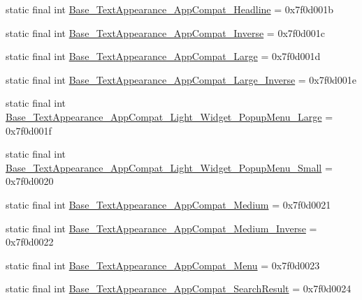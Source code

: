 \begin{DoxyCompactItemize}
\item 
static final int \mbox{\hyperlink{classcom_1_1google_1_1android_1_1gms_1_1R_1_1style_a36754d1d19d09b39f60065f500b5f89e}{Base\+\_\+\+Text\+Appearance\+\_\+\+App\+Compat\+\_\+\+Headline}} = 0x7f0d001b
\item 
static final int \mbox{\hyperlink{classcom_1_1google_1_1android_1_1gms_1_1R_1_1style_ab0fb396710204d40bb229cab77b8211c}{Base\+\_\+\+Text\+Appearance\+\_\+\+App\+Compat\+\_\+\+Inverse}} = 0x7f0d001c
\item 
static final int \mbox{\hyperlink{classcom_1_1google_1_1android_1_1gms_1_1R_1_1style_a6941c83f3d956d91e63c1f87a7c9e48a}{Base\+\_\+\+Text\+Appearance\+\_\+\+App\+Compat\+\_\+\+Large}} = 0x7f0d001d
\item 
static final int \mbox{\hyperlink{classcom_1_1google_1_1android_1_1gms_1_1R_1_1style_a20fa719f89a28f9d9fe107e5ac79b0ca}{Base\+\_\+\+Text\+Appearance\+\_\+\+App\+Compat\+\_\+\+Large\+\_\+\+Inverse}} = 0x7f0d001e
\item 
static final int \mbox{\hyperlink{classcom_1_1google_1_1android_1_1gms_1_1R_1_1style_ac6bddb54745ed50d642f3bd2a5b793bd}{Base\+\_\+\+Text\+Appearance\+\_\+\+App\+Compat\+\_\+\+Light\+\_\+\+Widget\+\_\+\+Popup\+Menu\+\_\+\+Large}} = 0x7f0d001f
\item 
static final int \mbox{\hyperlink{classcom_1_1google_1_1android_1_1gms_1_1R_1_1style_ad3565e7b776ab3a3e8199211100a573c}{Base\+\_\+\+Text\+Appearance\+\_\+\+App\+Compat\+\_\+\+Light\+\_\+\+Widget\+\_\+\+Popup\+Menu\+\_\+\+Small}} = 0x7f0d0020
\item 
static final int \mbox{\hyperlink{classcom_1_1google_1_1android_1_1gms_1_1R_1_1style_ae3614ca0a08c410589f4b9dba8b26224}{Base\+\_\+\+Text\+Appearance\+\_\+\+App\+Compat\+\_\+\+Medium}} = 0x7f0d0021
\item 
static final int \mbox{\hyperlink{classcom_1_1google_1_1android_1_1gms_1_1R_1_1style_ad0374fe4b275da5e000ed1995f115c6c}{Base\+\_\+\+Text\+Appearance\+\_\+\+App\+Compat\+\_\+\+Medium\+\_\+\+Inverse}} = 0x7f0d0022
\item 
static final int \mbox{\hyperlink{classcom_1_1google_1_1android_1_1gms_1_1R_1_1style_ad34110694aa060f7a5d8b7946aca95c6}{Base\+\_\+\+Text\+Appearance\+\_\+\+App\+Compat\+\_\+\+Menu}} = 0x7f0d0023
\item 
static final int \mbox{\hyperlink{classcom_1_1google_1_1android_1_1gms_1_1R_1_1style_a9c101b2c3b6f2dfee4f4750bdad5b4c2}{Base\+\_\+\+Text\+Appearance\+\_\+\+App\+Compat\+\_\+\+Search\+Result}} = 0x7f0d0024
\item 

\end{DoxyCompactItemize}
